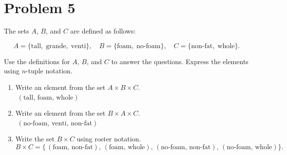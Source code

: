 \documentclass{amsart}
\theoremstyle{definition}
\theoremstyle{Exercise}
\theoremstyle{remark}
\theoremstyle{rule}
\numberwithin{equation}{section}
\begin{document}
\newpage

\section*{Problem 5}
The sets $A$, $B$, and $C$ are defined as follows:

\[
  A = \{\text{tall},\;\text{grande},\;\text{venti}\},\quad
  B = \{\text{foam},\;\text{no‑foam}\},\quad
  C = \{\text{non‑fat},\;\text{whole}\}.
\]

Use the definitions for $A$, $B$, and $C$ to answer the questions. Express the elements using $n$-tuple notation.

\begin{enumerate}[label=(\alph*)]
  \item Write an element from the set $A\times B\times C$.\\
  \(\;(\text{tall},\,\text{foam},\,\text{whole})\)

  \item Write an element from the set $B\times A\times C$.\\
  \(\;(\text{no‑foam},\,\text{venti},\,\text{non‑fat})\)

  \item Write the set $B\times C$ using roster notation.\\
  \[
    B\times C
    =\{\,
      (\text{foam},\,\text{non‑fat}),\,
      (\text{foam},\,\text{whole}),\,
      (\text{no‑foam},\,\text{non‑fat}),\,
      (\text{no‑foam},\,\text{whole})
    \}.
  \]
\end{enumerate}
\end{document}
